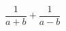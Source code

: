 \begin{ex}[type=expression]
	\begin{condition}
		\( \dfrac{1}{a+b}+\dfrac{1}{a-b} \)
	\end{condition}
\end{ex}